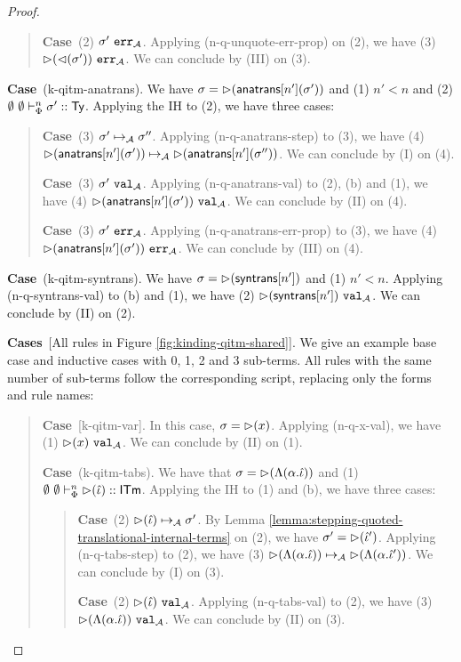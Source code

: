 \documentclass[12pt]{article}
\newcommand{\pfcase}[1]{\textbf{Case}~#1. }
\newcommand{\pfcases}[1]{\textbf{Cases}~#1. }
\begin{document}
\begin{proof}
\begin{quote}
    \pfcase{(2) $\sigma'~\mathtt{err}_{\mathcal{A}}$} Applying (n-q-unquote-err-prop) on (2), we have (3) ${\rhd}({\lhd}(\sigma'))~\mathtt{err}_{\mathcal{A}}$. We can conclude by (III) on (3).
\end{quote}

\pfcase{(k-qitm-anatrans)} We have $\sigma={\rhd}({\sf anatrans}[n'](\sigma'))$ and (1) $n' < n$ and (2) $\emptyset~\emptyset \vdash_{\Phi}^{n} \sigma' :: {\sf Ty}$. Applying the IH to (2), we have three cases:

\begin{quote}
    \pfcase{(3) $\sigma' \mapsto_{\mathcal{A}} \sigma''$} Applying (n-q-anatrans-step) to (3), we have (4) ${\rhd}({\sf anatrans}[n'](\sigma')) \mapsto_{\mathcal{A}} {\rhd}({\sf anatrans}[n'](\sigma''))$. We can conclude by (I) on (4).

    \pfcase{(3) $\sigma'~\mathtt{val}_{\mathcal{A}}$} Applying (n-q-anatrans-val) to (2), (b) and (1), we have (4) ${\rhd}({\sf anatrans}[n'](\sigma'))~\mathtt{val}_{\mathcal{A}}$. We can conclude by (II) on (4).

    \pfcase{(3) $\sigma'~\mathtt{err}_{\mathcal{A}}$} Applying (n-q-anatrans-err-prop) to (3), we have (4) ${\rhd}({\sf anatrans}[n'](\sigma'))~\mathtt{err}_{\mathcal{A}}$. We can conclude by (III) on (4).
\end{quote}

\pfcase{(k-qitm-syntrans)} We have $\sigma={\rhd}({\sf syntrans}[n'])$ and (1) $n' < n$. Applying (n-q-syntrans-val) to (b) and (1), we have (2) ${\rhd}({\sf syntrans}[n'])~\mathtt{val}_{\mathcal{A}}$. We can conclude by (II) on (2).

\pfcases{[All rules in Figure \ref{fig:kinding-qitm-shared}]} We give an example base case and inductive cases with 0, 1, 2 and 3 sub-terms. All rules with the same number of sub-terms follow the corresponding script, replacing only the forms and rule names:

\begin{quote}
    \pfcase{[k-qitm-var]} In this case, $\sigma={\rhd}(x)$. Applying (n-q-x-val), we have (1) ${\rhd}(x)~\mathtt{val}_{\mathcal{A}}$. We can conclude by (II) on (1).

    \pfcase{(k-qitm-tabs)} We have that $\sigma={\rhd}(\Lambda(\alpha.\hat{\iota}))$ and (1) $\emptyset~\emptyset \vdash_{\Phi}^{n} {\rhd}(\hat{\iota}) :: {\sf ITm}$. Applying the IH to (1) and (b), we have three cases:

    \begin{quote}
        \pfcase{(2) ${\rhd}(\hat{\iota}) \mapsto_{\mathcal{A}} \sigma'$} By Lemma \ref{lemma:stepping-quoted-translational-internal-terms} on (2), we have $\sigma'={\rhd}(\hat{\iota}')$. Applying (n-q-tabs-step) to (2), we have (3) ${\rhd}(\Lambda(\alpha.\hat{\iota})) \mapsto_{\mathcal{A}} {\rhd}(\Lambda(\alpha.\hat{\iota}'))$. We can conclude by (I) on (3).

        \pfcase{(2) ${\rhd}(\hat{\iota})~\mathtt{val}_{\mathcal{A}}$} Applying (n-q-tabs-val) to (2), we have (3) ${\rhd}(\Lambda(\alpha.\hat{\iota}))~\mathtt{val}_{\mathcal{A}}$. We can conclude by (II) on (3).


\end{quote}
\end{quote}
\end{proof}
\end{document}
